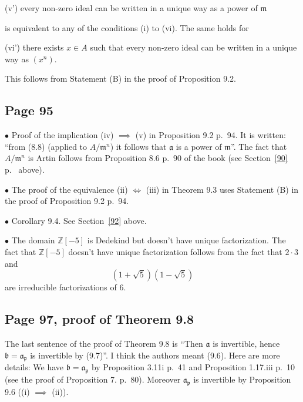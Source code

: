 \documentclass[parskip=half,fontsize=12pt]{scrartcl}%
\newcommand{\mf}{\mathfrak}
\newcommand{\aaa}{\mf a}
\newcommand{\bbb}{\mf b}
\newcommand{\mmm}{\mf m}
\newcommand{\ppp}{\mf p}
\newcommand{\bu}{\bullet}
\begin{document}
(v') every non-zero ideal can be written in a unique way as a power of $\mmm$

is equivalent to any of the conditions (i) to (vi). The same holds for

(vi') there exists $x\in A$ such that every non-zero ideal can be written in a unique way as $(x^n)$.

This follows from Statement (B) in the proof of Proposition 9.2.

\subsection{Page 95}%

$\bu$ Proof of the implication (iv) $\implies$ (v) in Proposition 9.2 p.~94. It is written: ``from (8.8) (applied to $A/\mmm^n$) it follows that $\aaa$ is a power of $\mmm$''. The fact that $A/\mmm^n$ is Artin follows from Proposition 8.6 p.~90 of the book (see Section~\ref{90} p.~\pageref{90} above). %

$\bu$ The proof of the equivalence (ii) $\iff$ (iii) in Theorem 9.3 uses Statement (B) in the proof of Proposition 9.2 p.~94.

$\bu$ Corollary 9.4. See Section~\ref{92} above.

$\bu$ The domain $\mathbb Z[-5]$ is Dedekind but doesn't have unique factorization. %
The fact that $\mathbb Z[-5]$ doesn't have unique factorization follows from the fact that $2\cdot3$ and $$\left(1+\sqrt5\right)\left(1-\sqrt5\right)$$ are irreducible factorizations of $6$.%

\subsection{Page 97, proof of Theorem 9.8}%

The last sentence of the proof of Theorem 9.8 is ``Then $\aaa$ is invertible, hence $\bbb=\aaa_\ppp$ is invertible by (9.7)''. I think the authors meant (9.6). Here are more details: We have $\bbb=\aaa_\ppp$ by Proposition 3.11i p.~41 and Proposition 1.17.iii p.~10 (see the proof of Proposition 7. p.~80). Moreover $\aaa_\ppp$ is invertible by Proposition 9.6 ((i) $\implies$ (ii)). 
\end{document}
